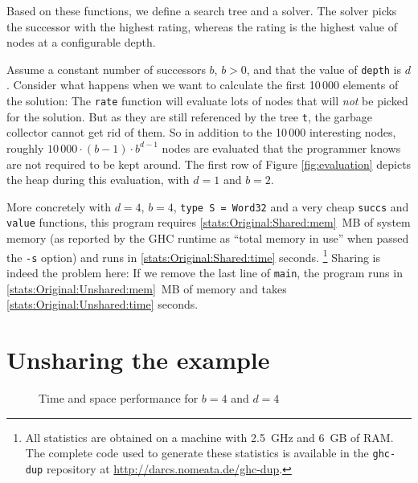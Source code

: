 \documentclass[preprint]{sigplanconf}
\theoremstyle{nonumberplain}
\newcommand{\li}{\lstinline[style=Haskell]}
\newcommand{\ci}{\lstinline[style=Cmm]}
\begin{document}
Based on these functions, we define a search tree and a solver. The solver picks the successor with the highest rating, whereas the rating is the highest value of nodes at a configurable depth.

Assume a constant number of successors $b$, $b>0$, and that the value of \li-depth- is $d$. Consider what happens when we want to calculate the first 10\,000 elements of the solution: The \li-rate- function will evaluate lots of nodes that will \emph{not} be picked for the solution. But as they are still referenced by the tree \li-t-, the garbage collector cannot get rid of them. So in addition to the  10\,000 interesting nodes, roughly $10\,000\cdot (b-1)\cdot b^{d-1}$ nodes are evaluated that the programmer knows are not required to be kept around. The first row of Figure \ref{fig:evaluation} depicts the heap during this evaluation, with $d=1$ and $b=2$.

\newcommand{\stats}[1]{\ref*{#1}}
More concretely with $d=4$, $b=4$, \li-type S = Word32- and a very cheap \li-succs- and \li-value- functions, this program requires \stats{stats:Original:Shared:mem}~MB of system memory (as reported by the GHC runtime as “total memory in use” when passed the \ci!-s! option) and runs in \stats{stats:Original:Shared:time} seconds.%
\footnote{All statistics are obtained on a machine with 2.5~GHz and 6~GB of RAM. The complete code used to generate these statistics is available in the \ci!ghc-dup! repository at \url{http://darcs.nomeata.de/ghc-dup}.} Sharing is indeed the problem here: If we remove the last line of \li-main-, the program runs in \stats{stats:Original:Unshared:mem}~MB of memory and takes \stats{stats:Original:Unshared:time} seconds.

\section{Unsharing the example}
\label{sec:unsharing}

\begin{figure*}
\centering

\caption{Time and space performance for $b=4$ and $d=4$}
\label{fig:stats}
\end{figure*}
\end{document}
